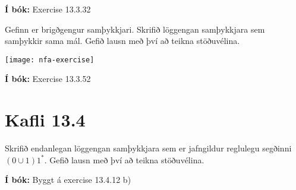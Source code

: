\documentclass{article}
\begin{document}
\textbf{Í bók:} Exercise 13.3.32

\question Gefinn er brigðgengur samþykkjari. Skrifið löggengan samþykkjara sem samþykkir sama mál. Gefið lausn með því að teikna stöðuvélina.

\begin{center}
    \texttt{[image: nfa-exercise]}
\end{center}

\textbf{Í bók:} Exercise 13.3.52

\section{Kafli 13.4}

\question Skrifið endanlegan löggengan samþykkjara sem er jafngildur reglulegu segðinni $(0 \cup 1)1^*$. Gefið lausn með því að teikna stöðuvélina.

\textbf{Í bók:} Byggt á exercise 13.4.12 b)
\end{document}
